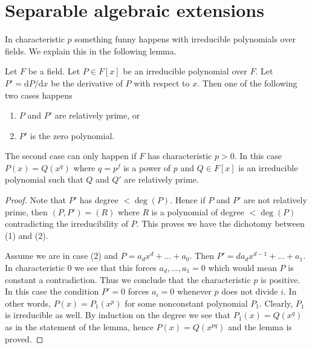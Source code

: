 \section{Separable algebraic extensions}
\label{section-separable-extensions}

\noindent
In characteristic $p$ something funny happens with irreducible polynomials
over fields. We explain this in the following lemma.

\begin{lemma}
\label{lemma-irreducible-polynomials}
Let $F$ be a field. Let $P \in F[x]$ be an irreducible polynomial over $F$.
Let $P' = \text{d}P/\text{d}x$ be the derivative of $P$ with respect
to $x$. Then one of the following two cases happens
\begin{enumerate}
\item $P$ and $P'$ are relatively prime, or
\item $P'$ is the zero polynomial.
\end{enumerate}
The second case can only happen if $F$ has characteristic $p > 0$.
In this case $P(x) = Q(x^q)$ where $q = p^f$ is a power of $p$ and
$Q \in F[x]$ is an irreducible polynomial such that $Q$ and $Q'$
are relatively prime.
\end{lemma}

\begin{proof}
Note that $P'$ has degree $< \deg(P)$. Hence if $P$ and $P'$ are not relatively
prime, then $(P, P') = (R)$ where $R$ is a polynomial of degree $< \deg(P)$
contradicting the irreducibility of $P$. This proves we have the dichotomy
between (1) and (2).

\medskip\noindent
Assume we are in case (2) and $P = a_d x^d + \ldots + a_0$. Then
$P' = da_d x^{d - 1} + \ldots + a_1$. In characteristic $0$ we see
that this forces $a_d, \ldots, a_1 = 0$ which would mean $P$ is constant
a contradiction. Thus we conclude that the characteristic $p$ is positive.
In this case the condition $P' = 0$ forces $a_i = 0$ whenever $p$ does
not divide $i$.
In other words, $P(x) = P_1(x^p)$ for some nonconstant polynomial $P_1$.
Clearly, $P_1$ is irreducible as well. By induction on the degree we
see that $P_1(x) = Q(x^q)$ as in the statement of the lemma, hence
$P(x) = Q(x^{pq})$ and the lemma is proved.
\end{proof}

